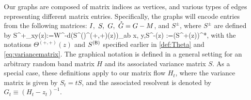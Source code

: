 Our graphs are composed of matrix indices as vertices, and various types of edges representing different matrix entries. Specifically, the graphs will encode entries from the following matrices: $I, \ S, \ G, \ {\mathring G}=G-M$, and $S^{\pm}$, where $S^{\pm}$ are defined by 
\be\label{eq:def-Spm}
S^+_{xy}(z):=W^{-d}\big(S^{(\sB)}\Theta^{(+,+)}(z)\big)_{ab} \quad {}\quad x\in[a], y\in [b],\quad {}\quad S^-(z) :=(S^+(z))^*, %
\ee
with the notations $\Theta^{(+,+)}(z)$ and $S^{({\mathsf{B}})}$ specified earlier in \eqref{def:Theta} and \eqref{eq:variancematrix}. 
The graphical notation is defined in a general setting for an arbitrary random band matrix $H$ and its associated variance matrix $S$. As a special case, these definitions apply to our matrix flow $H_t$, where the variance matrix is given by $S_t=tS$, and the associated resolvent is denoted by $G_t\equiv (H_t-z_t)^{-1}$.  

